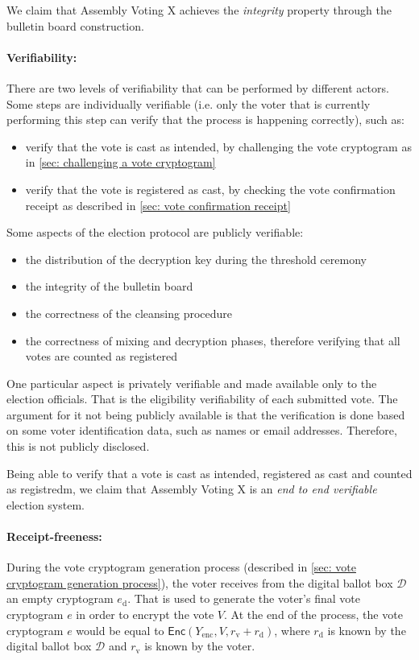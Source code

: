 We claim that Assembly Voting X achieves the \textit{integrity} property through the bulletin board construction.


\paragraph{Verifiability:}
There are two levels of verifiability that can be performed by different actors. Some steps are individually verifiable (i.e. only the voter that is currently performing this step can verify that the process is happening correctly), such as:
\begin{itemize}
    \item verify that the vote is cast as intended, by challenging the vote cryptogram as in \cref{sec: challenging a vote cryptogram}
    \item verify that the vote is registered as cast, by checking the vote confirmation receipt as described in  \cref{sec: vote confirmation receipt}
\end{itemize}

Some aspects of the election protocol are publicly verifiable:
\begin{itemize}
    \item the distribution of the decryption key during the threshold ceremony
    \item the integrity of the bulletin board
    \item the correctness of the cleansing procedure
    \item the correctness of mixing and decryption phases, therefore verifying that all votes are counted as registered
\end{itemize}

One particular aspect is privately verifiable and made available only to the election officials. That is the eligibility verifiability of each submitted vote. The argument for it not being publicly available is that the verification is done based on some voter identification data, such as names or email addresses. Therefore, this is not publicly disclosed.

Being able to verify that a vote is cast as intended, registered as cast and counted as registredm, we claim that Assembly Voting X is an \textit{end to end verifiable} election system.


\paragraph{Receipt-freeness:}
During the vote cryptogram generation process (described in \cref{sec: vote cryptogram generation process}), the voter receives from the digital ballot box $\mathcal{D}$ an empty cryptogram $e_\mathrm{d}$. That is used to generate the voter's final vote cryptogram $e$ in order to encrypt the vote $V$. At the end of the process, the vote cryptogram $e$ would be equal to $\mathsf{Enc} (Y_\mathrm{enc}, V, r_\mathrm{v} + r_\mathrm{d})$, where $r_\mathrm{d}$ is known by the digital ballot box $\mathcal{D}$ and $r_\mathrm{v}$ is known by the voter.

